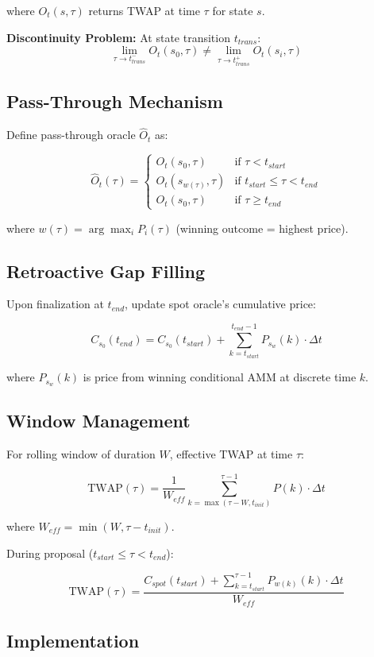 \documentclass{article}
\begin{document}
where $O_t(s, \tau)$ returns TWAP at time $\tau$ for state $s$.

\textbf{Discontinuity Problem:} At state transition $t_{trans}$:
$$\lim_{\tau \to t_{trans}^-} O_t(s_0, \tau) \neq \lim_{\tau \to t_{trans}^+} O_t(s_i, \tau)$$

\subsection{Pass-Through Mechanism}

Define pass-through oracle $\hat{O}_t$ as:

$$\hat{O}_t(\tau) = \begin{cases}
O_t(s_0, \tau) & \text{if } \tau < t_{start} \\
O_t(s_{w(\tau)}, \tau) & \text{if } t_{start} \leq \tau < t_{end} \\
O_t(s_0, \tau) & \text{if } \tau \geq t_{end}
\end{cases}$$

where $w(\tau) = \arg\max_{i} P_i(\tau)$ (winning outcome = highest price).

\subsection{Retroactive Gap Filling}

Upon finalization at $t_{end}$, update spot oracle's cumulative price:

$$C_{s_0}(t_{end}) = C_{s_0}(t_{start}) + \sum_{k=t_{start}}^{t_{end}-1} P_{s_w}(k) \cdot \Delta t$$

where $P_{s_w}(k)$ is price from winning conditional AMM at discrete time $k$.

\subsection{Window Management}

For rolling window of duration $W$, effective TWAP at time $\tau$:

$$\text{TWAP}(\tau) = \frac{1}{W_{eff}} \sum_{k=\max(\tau - W, t_{init})}^{\tau-1} P(k) \cdot \Delta t$$

where $W_{eff} = \min(W, \tau - t_{init})$.

During proposal ($t_{start} \leq \tau < t_{end}$):

$$\text{TWAP}(\tau) = \frac{C_{spot}(t_{start}) + \sum_{k=t_{start}}^{\tau-1} P_{w(k)}(k) \cdot \Delta t}{W_{eff}}$$

\subsection{Implementation}
\end{document}
